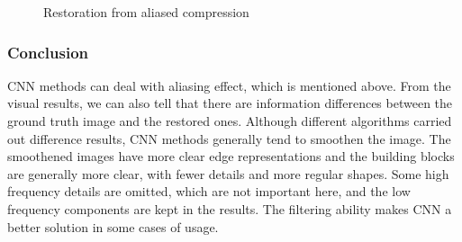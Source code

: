 \documentclass[10pt,twocolumn,letterpaper]{article}
\begin{document}
\begin{figure}[H]
    \caption{Restoration from aliased compression}
\end{figure}
\subsubsection*{Conclusion}
CNN methods can deal with aliasing effect, which is mentioned above.
From the visual results, we can also tell that there are information differences between the ground truth image and the restored ones.
Although different algorithms carried out difference results, CNN methods generally tend to smoothen the image.
The smoothened images have more clear edge representations and the building blocks are generally more clear, with fewer details and more regular shapes.
Some high frequency details are omitted, which are not important here, and the low frequency components are kept in the results.
The filtering ability makes CNN a better solution in some cases of usage.

{\small


}
\end{document}
